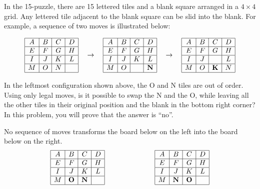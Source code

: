 \documentclass[twoside,12pt]{article}
\begin{document}

\begin{problem}{20}

In the 15-puzzle, there are 15 lettered tiles and a blank square
arranged in a $4 \times 4$ grid.  Any lettered tile adjacent to the
blank square can be slid into the blank.  For example, a sequence of
two moves is illustrated below:

\[
\begin{array}{|c|c|c|c|}
\hline
A & B & C & D \\ \hline
E & F & G & H \\ \hline
I & J & K & L \\ \hline
M & O & N &  \\ \hline
\end{array}
\quad \rightarrow \quad
\begin{array}{|c|c|c|c|}
\hline
A & B & C & D \\ \hline
E & F & G & H \\ \hline
I & J & K & L \\ \hline
M & O &   & \mathbf{N} \\ \hline
\end{array}
\quad \rightarrow \quad
\begin{array}{|c|c|c|c|}
\hline
A & B & C & D \\ \hline
E & F & G & H \\ \hline
I & J &   & L \\ \hline
M & O & \mathbf{K} & N \\ \hline
\end{array}
\]

In the leftmost configuration shown above, the O and N tiles are out
of order.   Using only legal moves, is it possible to  swap the
N and the O, while leaving all the other tiles in their original position
and the blank in the bottom right corner?
In this problem, you will prove that the answer is ``no''.

\begin{theorem*}
No sequence of moves transforms the board below on the left into the
board below on the right.
%
\[
\begin{array}{|c|c|c|c|}
\hline
A & B & C & D \\ \hline
E & F & G & H \\ \hline
I & J & K & L \\ \hline
M & \mathbf{O} & \mathbf{N} &  \\ \hline
\end{array}
\hspace{1in}
\begin{array}{|c|c|c|c|}
\hline
A & B & C & D \\ \hline
E & F & G & H \\ \hline
I & J & K & L \\ \hline
M & \mathbf{N} & \mathbf{O} &  \\ \hline
\end{array}
\]
\end{theorem*}


\end{problem}
\end{document}
